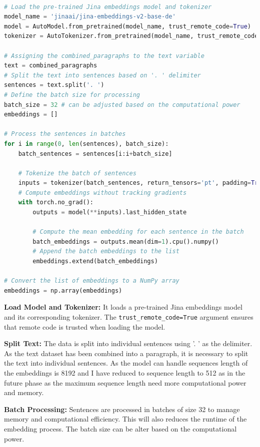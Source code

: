  \begin{lstlisting}[language=Python, caption={Load Jina AI embedding model and tokenizer}]

# Load the pre-trained Jina embeddings model and tokenizer
model_name = 'jinaai/jina-embeddings-v2-base-de'
model = AutoModel.from_pretrained(model_name, trust_remote_code=True)
tokenizer = AutoTokenizer.from_pretrained(model_name, trust_remote_code=True)

# Assigning the combined_paragraphs to the text variable
text = combined_paragraphs
# Split the text into sentences based on '. ' delimiter
sentences = text.split('. ')
# Define the batch size for processing
batch_size = 32 # can be adjusted based on the computational power
embeddings = []

# Process the sentences in batches
for i in range(0, len(sentences), batch_size):
    batch_sentences = sentences[i:i+batch_size]
    
    # Tokenize the batch of sentences
    inputs = tokenizer(batch_sentences, return_tensors='pt', padding=True, truncation=True, max_length=512)
    # Compute embeddings without tracking gradients
    with torch.no_grad():
        outputs = model(**inputs).last_hidden_state
        
        # Compute the mean embedding for each sentence in the batch
        batch_embeddings = outputs.mean(dim=1).cpu().numpy()
        # Append the batch embeddings to the list
        embeddings.extend(batch_embeddings)

# Convert the list of embeddings to a NumPy array
embeddings = np.array(embeddings)
\end{lstlisting}

\noindent\textbf{Load Model and Tokenizer:} It loads a pre-trained Jina embeddings model and its corresponding tokenizer. 
The \texttt{trust\_remote\_code=True} argument ensures that remote code is trusted when loading the model.

\noindent\textbf{Split Text:} The data is split into individual sentences using '. ' as the delimiter.
As the text dataset has been combined into a paragraph, it is necessary to split the text into individual sentences.
As the model can handle sequences length of the embeddings is 8192 and I have reduced to sequence length to 512 as in the future phase
as the maximum sequence length need more computational power and memory. 

\noindent\textbf{Batch Processing:} Sentences are processed in batches of size 32 to manage memory and computational efficiency.
This will also reduces the runtime of the embedding process. The batch size can be alter based on the computational power.

